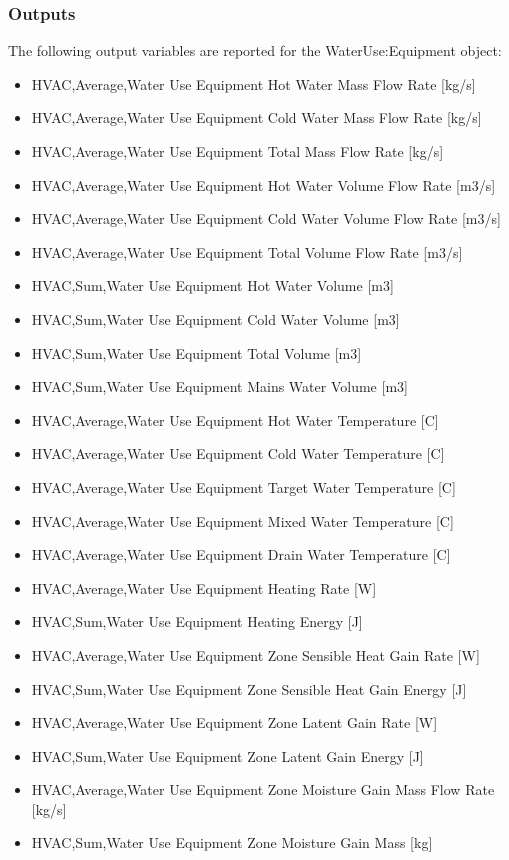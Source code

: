 \subsubsection{Outputs}\label{outputs-041}

The following output variables are reported for the WaterUse:Equipment object:

\begin{itemize}
\item
  HVAC,Average,Water Use Equipment Hot Water Mass Flow Rate {[}kg/s{]}
\item
  HVAC,Average,Water Use Equipment Cold Water Mass Flow Rate {[}kg/s{]}
\item
  HVAC,Average,Water Use Equipment Total Mass Flow Rate {[}kg/s{]}
\item
  HVAC,Average,Water Use Equipment Hot Water Volume Flow Rate {[}m3/s{]}
\item
  HVAC,Average,Water Use Equipment Cold Water Volume Flow Rate {[}m3/s{]}
\item
  HVAC,Average,Water Use Equipment Total Volume Flow Rate {[}m3/s{]}
\item
  HVAC,Sum,Water Use Equipment Hot Water Volume {[}m3{]}
\item
  HVAC,Sum,Water Use Equipment Cold Water Volume {[}m3{]}
\item
  HVAC,Sum,Water Use Equipment Total Volume {[}m3{]}
\item
  HVAC,Sum,Water Use Equipment Mains Water Volume {[}m3{]}
\item
  HVAC,Average,Water Use Equipment Hot Water Temperature {[}C{]}
\item
  HVAC,Average,Water Use Equipment Cold Water Temperature {[}C{]}
\item
  HVAC,Average,Water Use Equipment Target Water Temperature {[}C{]}
\item
  HVAC,Average,Water Use Equipment Mixed Water Temperature {[}C{]}
\item
  HVAC,Average,Water Use Equipment Drain Water Temperature {[}C{]}
\item
  HVAC,Average,Water Use Equipment Heating Rate {[}W{]}
\item
  HVAC,Sum,Water Use Equipment Heating Energy {[}J{]}
\item
  HVAC,Average,Water Use Equipment Zone Sensible Heat Gain Rate {[}W{]}
\item
  HVAC,Sum,Water Use Equipment Zone Sensible Heat Gain Energy {[}J{]}
\item
  HVAC,Average,Water Use Equipment Zone Latent Gain Rate {[}W{]}
\item
  HVAC,Sum,Water Use Equipment Zone Latent Gain Energy {[}J{]}
\item
  HVAC,Average,Water Use Equipment Zone Moisture Gain Mass Flow Rate {[}kg/s{]}
\item
  HVAC,Sum,Water Use Equipment Zone Moisture Gain Mass {[}kg{]}
\end{itemize}

